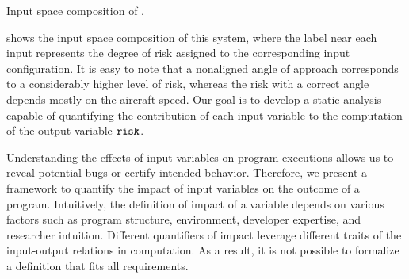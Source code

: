 \begin{marginfigure}
\centering
{}
\caption{Input space composition of .}
\end{marginfigure}

 shows the input space composition of this system, where the label near each input represents the degree of risk assigned to the corresponding input configuration.
It is easy to note that a nonaligned angle of approach corresponds to a considerably higher level of risk, whereas the risk with a correct angle depends mostly on the aircraft speed.
Our goal is to develop a static analysis capable of quantifying the contribution of each input variable to the computation of the output variable $\texttt{risk}{}$.


\newcommand{\exampleinput}[1][\defaultprogramexampleletter]{\textsc{Input}_{#1}}

Understanding the effects of input variables on program executions allows us to reveal potential bugs or certify intended behavior.
Therefore, we present a framework to quantify the impact of input variables on the outcome of a program.
Intuitively, the definition of impact of a variable depends on various factors such as program structure, environment, developer expertise, and researcher intuition.
Different quantifiers of impact leverage different traits of the input-output relations in computation.
As a result, it is not possible to formalize a definition that fits all requirements.

